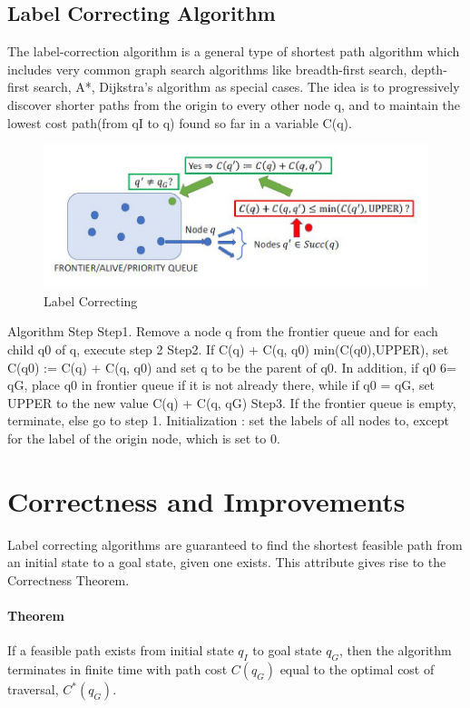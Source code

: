 \documentclass[twoside]{article}
\begin{document}
\subsection{Label Correcting Algorithm}
The label-correction algorithm is a general type of shortest path algorithm which includes very common graph search algorithms like breadth-first search, depth-first search, A*, Dijkstra’s algorithm as special cases.
The idea is to progressively discover shorter paths from the origin to every other node q, and to maintain the lowest cost path(from qI to q) found so far in a variable C(q).

\begin{figure}[h]
\begin{center}
\includegraphics{fig15_10.PNG}
\caption{Label Correcting}
\end{center}
\end{figure}

Algorithm Step
Step1. Remove a node q from the frontier queue and for each child q0 of q, execute step 2
Step2. If C(q) + C(q, q0) min(C(q0),UPPER), set C(q0) := C(q) + C(q, q0) and set q to be the parent of q0. In addition, if q0 6= qG, place q0 in frontier queue if it is not already there, while if q0 = qG, set UPPER to the new value C(q) + C(q, qG)
Step3. If the frontier queue is empty, terminate, else go to step 1.
Initialization : set the labels of all nodes to, except for the label of the origin node, which is set to 0.


\section{Correctness and Improvements}
Label correcting algorithms are guaranteed to find the shortest feasible path from an initial state to a goal state, given one exists. This attribute gives rise to the Correctness Theorem. \vspace{-0.5cm}
\paragraph{Theorem} If a feasible path exists from initial state $q_I$ to goal state $q_G$, then the algorithm terminates in finite time with path cost $C(q_G)$ equal to the optimal cost of traversal, $C^*(q_G)$.\\
\end{document}
